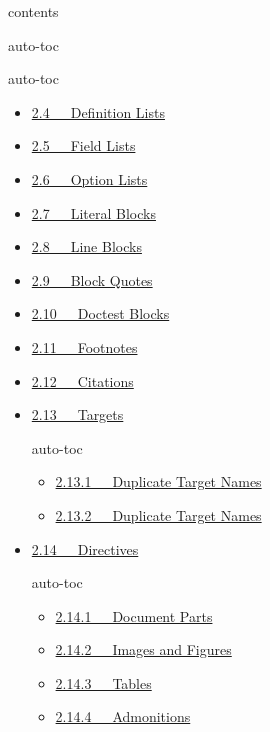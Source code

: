 \documentclass[a4paper]{article}
\begin{document}
\begin{DUclass}{contents}
\begin{DUclass}{auto-toc}
\begin{itemize}
\begin{DUclass}{auto-toc}
\begin{itemize}
\item \hyperref[definition-lists]{2.4   Definition Lists}

\item \hyperref[field-lists]{2.5   Field Lists}

\item \hyperref[option-lists]{2.6   Option Lists}

\item \hyperref[literal-blocks]{2.7   Literal Blocks}

\item \hyperref[line-blocks]{2.8   Line Blocks}

\item \hyperref[block-quotes]{2.9   Block Quotes}

\item \hyperref[doctest-blocks]{2.10   Doctest Blocks}

\item \hyperref[footnotes]{2.11   Footnotes}

\item \hyperref[citations]{2.12   Citations}

\item \hyperref[another-target]{2.13   Targets}

\begin{DUclass}{auto-toc}
\begin{itemize}
\item \hyperref[duplicate-target-names-1]{2.13.1   Duplicate Target Names}

\item \hyperref[duplicate-target-names-2]{2.13.2   Duplicate Target Names}
\end{itemize}
\end{DUclass}

\item \hyperref[directives]{2.14   Directives}

\begin{DUclass}{auto-toc}
\begin{itemize}
\item \hyperref[document-parts]{2.14.1   Document Parts}

\item \hyperref[images-and-figures]{2.14.2   Images and Figures}

\item \hyperref[tables]{2.14.3   Tables}

\item \hyperref[admonitions]{2.14.4   Admonitions}


\end{itemize}
\end{DUclass}
\end{itemize}
\end{DUclass}
\end{itemize}
\end{DUclass}
\end{DUclass}
\end{document}
